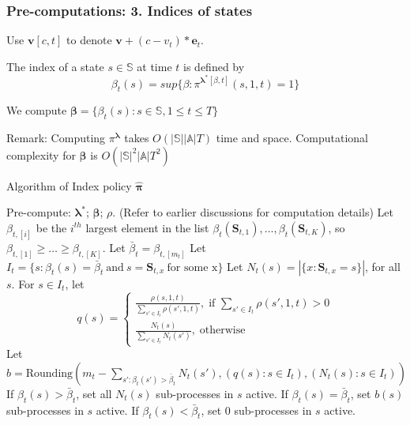 \documentclass{beamer}
\newcommand{\betav}{\pmb{\beta}}
\newcommand{\lambdav}{\pmb{\lambda}}
\newcommand{\allp}{\pmb{\pi}}
\newcommand{\allstater}{\mathbf{S}}
\newcommand{\substates}{\mathbb{S}}
\newcommand{\substate}{s}
\newcommand{\subactions}{\mathbb{A}}
\begin{document}
\begin{frame}
\frametitle{Pre-computations: 3. Indices of states}
Use $\mathbf{v}[c,t]$ to denote $\mathbf{v}+(c-v_t)*\mathbf{e}_t$.

\vspace{0.5cm}
The index of a state $\substate\in\substates$ at time $t$ is defined by
\begin{equation}
\beta_t(s) = sup\{\beta: \pi^{\lambdav^*[\beta,t]}(s,1,t)=1\}
\end{equation}

\vspace{0.5cm}
We compute $\betav = \{\beta_t(s):s\in\substates,1\leq t\leq T\}$


\vspace{0.5cm}
Remark: Computing $\pi^{\lambdav}$ takes $O(|\substates||\subactions|T)$ time and space. Computational complexity for $\betav$ is $O(|\substates|^2|\subactions|T^2)$
\end{frame}

\begin{frame}{Algorithm of Index policy $\hat{\allp}$}
\begin{algorithm}[H]
\footnotesize
\begin{algorithmic}
\STATE Pre-compute: $\lambdav^*$; $\betav$; $\rho$. (Refer to earlier discussions for computation details) 
    \STATE Let $\beta_{t,[i]}$ be the $i^{th}$ largest element in the list $\beta_t(\allstater_{t,1}),...,\beta_t(\allstater_{t,K})$, so $\beta_{t,[1]}\geq\ldots\geq \beta_{t,[K]}$. 
    \STATE Let $\bar{\beta}_t = \beta_{t,[m_t]}$
    \STATE Let $I_t=\{\substate : \beta_t(s)=\bar{\beta}_t\ \text{and}\ s=\allstater_{t,x}\ \text{for some x}\}$
    \STATE Let $N_t(s) = |\{x:\allstater_{t,x}=s\}|$, for all $\substate$.
    \STATE For $\substate\in I_t$, let 
    $$
    q(s) = 
    \begin{cases}
	\frac{\rho(s,1,t)}{\sum_{s'\in I_t}\rho(s',1,t)}, \; \text{if } \sum_{s'\in I_t}\rho(s',1,t)>0\\
	\frac{N_t(s)}{\sum_{s'\in I_t} N_t(s')}, \; \text{otherwise}
    \end{cases}
    $$
    Let $b = \mathrm{Rounding}(m_t-\sum_{s':\beta_t(s')>\bar{\beta}_t}N_t(s'),
    (q(s):s\in I_t),(N_t(s):s\in I_t))$
    \FOR{all $\substate$}
    \STATE If $\beta_t(s)>\bar{\beta}_t$, set all $N_t(s)$ sub-processes in $s$ active.
    \STATE If $\beta_t(s)= \bar{\beta}_t$, set $b(s)$ sub-processes in $s$ active.
    \STATE If $\beta_t(s)< \bar{\beta}_t$, set 0 sub-processes in $s$ active.
    \ENDFOR
  \ENDFOR
\end{algorithmic}
\end{algorithm}

\end{frame}
\end{document}

